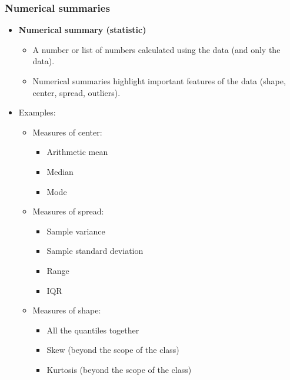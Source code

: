 \documentclass{beamer}\usepackage{graphicx, color}
\numberwithin{equation}{section}
\begin{document}
\begin{frame}
\frametitle{Numerical summaries}
\begin{itemize}
\item {\bf Numerical summary (statistic)}
\begin{itemize}
\item A number or list of numbers calculated using the data (and only the data).
\pause \item Numerical summaries highlight important features of the data (shape, center, spread, outliers).
\end{itemize}
\pause \item Examples:
\begin{itemize}
\item Measures of center:
\begin{itemize}
\item Arithmetic mean
\pause \item Median
\pause \item Mode
\end{itemize}
\pause \item Measures of spread:
\begin{itemize}
 \item Sample variance
\pause \item Sample standard deviation
\pause \item Range
\pause \item IQR
\end{itemize}
\pause \item Measures of shape:
\begin{itemize}
\item All the quantiles together
\pause  \item Skew (beyond the scope of the class) 
\pause \item Kurtosis (beyond the scope of the class)
\end{itemize}
\end{itemize}
\end{itemize}
\end{frame}
\end{document}

